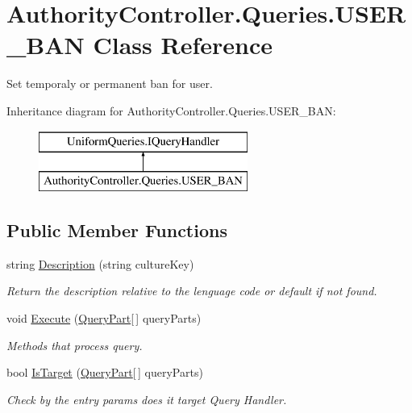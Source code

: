 \hypertarget{class_authority_controller_1_1_queries_1_1_u_s_e_r___b_a_n}{}\section{Authority\+Controller.\+Queries.\+U\+S\+E\+R\+\_\+\+B\+AN Class Reference}
\label{class_authority_controller_1_1_queries_1_1_u_s_e_r___b_a_n}


Set temporaly or permanent ban for user.  


Inheritance diagram for Authority\+Controller.\+Queries.\+U\+S\+E\+R\+\_\+\+B\+AN\+:\begin{figure}[H]
\begin{center}
\leavevmode
\includegraphics[height=2.000000cm]{d3/d4f/class_authority_controller_1_1_queries_1_1_u_s_e_r___b_a_n}
\end{center}
\end{figure}
\subsection*{Public Member Functions}
\begin{DoxyCompactItemize}
\item 
string \mbox{\hyperlink{class_authority_controller_1_1_queries_1_1_u_s_e_r___b_a_n_a0635966a71b389cbb4354e61e3c52513}{Description}} (string culture\+Key)
\begin{DoxyCompactList}\small\item\em Return the description relative to the lenguage code or default if not found. \end{DoxyCompactList}\item 
void \mbox{\hyperlink{class_authority_controller_1_1_queries_1_1_u_s_e_r___b_a_n_a719795c950c9dedbc187c2c0cfca37a7}{Execute}} (\mbox{\hyperlink{struct_uniform_queries_1_1_query_part}{Query\+Part}}\mbox{[}$\,$\mbox{]} query\+Parts)
\begin{DoxyCompactList}\small\item\em Methods that process query. \end{DoxyCompactList}\item 
bool \mbox{\hyperlink{class_authority_controller_1_1_queries_1_1_u_s_e_r___b_a_n_a29c898b411adc3a0edbed31cf90e007b}{Is\+Target}} (\mbox{\hyperlink{struct_uniform_queries_1_1_query_part}{Query\+Part}}\mbox{[}$\,$\mbox{]} query\+Parts)
\begin{DoxyCompactList}\small\item\em Check by the entry params does it target Query Handler. \end{DoxyCompactList}\end{DoxyCompactItemize}


